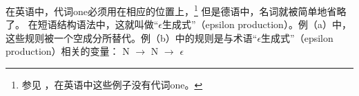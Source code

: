 在英语中，代词one必须用在相应的位置上，\footnote{%
参见 \citet[\S~4.12]{FLGR2012a} ，在英语中这些例子没有代词one。
} 但是德语中，名词就被简单地省略了。
在短语结构语法中，这就叫做“$\epsilon$生成式”（epsilon production）。例（a）中，这些规则被一个空成分所替代。例（b）中的规则是与术语“$\epsilon$生成式”（epsilon production）相关的变量：
\eal
\label{np-epsilon}
\ex N $\to$
\ex N $\to$ $\epsilon$
\zl 

